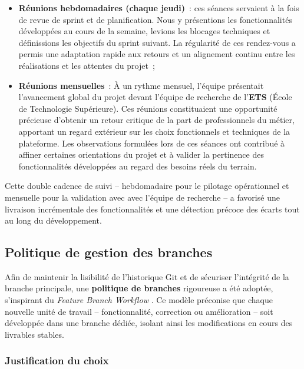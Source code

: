\begin{itemize}
    \item \textbf{Réunions hebdomadaires (chaque jeudi)}~: ces séances servaient à la fois de
          revue de sprint et de planification. Nous y présentions les fonctionnalités développées
          au cours de la semaine, levions les blocages techniques et définissions les objectifs du
          sprint suivant. La régularité de ces rendez-vous a permis une adaptation rapide aux
          retours et un alignement continu entre les réalisations et les attentes du projet~;
    \item \textbf{Réunions mensuelles}~: À un rythme mensuel, l'équipe présentait l'avancement global du projet devant l'équipe de recherche de l'\textbf{ETS} (École de Technologie Supérieure). Ces réunions constituaient une opportunité précieuse d'obtenir un retour critique de la part de professionnels du métier, apportant un regard extérieur sur les choix fonctionnels et techniques de la plateforme. Les observations formulées lors de ces séances ont contribué à affiner certaines orientations du projet et à valider la pertinence des fonctionnalités développées au regard des besoins réels du terrain.

\end{itemize}

Cette double cadence de suivi -- hebdomadaire pour le pilotage opérationnel et mensuelle pour la
validation avec avec l'équipe de recherche -- a favorisé une livraison incrémentale des fonctionnalités et une
détection précoce des écarts tout au long du développement.

\subsection{Politique de gestion des branches}

Afin de maintenir la lisibilité de l'historique Git et de sécuriser l'intégrité de la branche
principale, une \textbf{politique de branches} rigoureuse a été adoptée, s'inspirant du
\textit{Feature Branch Workflow} \parencite{atlassian2023gitflow}. Ce modèle préconise que chaque
nouvelle unité de travail -- fonctionnalité, correction ou amélioration -- soit développée dans
une branche dédiée, isolant ainsi les modifications en cours des livrables stables.

\subsubsection*{Justification du choix}

